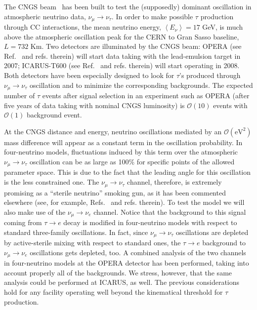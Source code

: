 \documentclass[12pt]{elsart}
\newcommand{\eVq}{\ensuremath{\text{eV}^2}}
\begin{document}
The CNGS beam~\cite{Giacomelli:2007df} has been built to test the
(supposedly) dominant oscillation in atmospheric neutrino data,
$\nu_\mu \to \nu_\tau$.  In order to make possible $\tau$ production
through CC interactions, the mean neutrino energy, $\left< E_\nu
\right> = 17$ GeV, is much above the atmospheric oscillation peak for
the CERN to Gran Sasso baseline, $L = 732$ Km. Two detectors are
illuminated by the CNGS beam: OPERA (see
Ref.~\cite{Acquafredda:2006ki} and refs. therein) will start data
taking with the lead-emulsion target in 2007; ICARUS-T600 (see
Ref.~\cite{Amerio:2004ze} and refs. therein) will start operating in
2008. Both detectors have been especially designed to look for
$\tau$'s produced through $\nu_\mu \to \nu_\tau$ oscillation and to
minimize the corresponding backgrounds. The expected number of $\tau$
events after signal selection in an experiment such as OPERA (after
five years of data taking with nominal CNGS luminosity) is
$\mathcal{O}(10)$ events with $\mathcal{O}(1)$ background event. 

At the CNGS distance and energy, neutrino oscillations mediated by an
$\mathcal{O}(\eVq)$ mass difference will appear as a constant term in
the oscillation probability. In four-neutrino models, fluctuations
induced by this term over the atmospheric $\nu_\mu \to \nu_\tau$
oscillation can be as large as 100\% for specific points of the
allowed parameter space.  This is due to the fact that the leading
angle for this oscillation is the less constrained one. 
%
The $\nu_\mu \to \nu_\tau$ channel, therefore, is extremely promising
as a ``sterile neutrino'' smoking gun, as it has been commented
elsewhere (see, for example, Refs.~\cite{Donini:2001xy, Donini:2001xp}
and refs. therein).  To test the model we will also make use of the
$\nu_\mu \to \nu_e$ channel. Notice that the background to this signal
coming from $\tau \to e$ decay is modified in four-neutrino models
with respect to standard three-family oscillations. In fact, since
$\nu_\mu \to \nu_\tau$ oscillations are depleted by active-sterile
mixing with respect to standard ones, the $\tau \to e$ background to
$\nu_\mu \to \nu_e$ oscillations gets depleted, too. A combined
analysis of the two channels in four-neutrino models at the OPERA
detector has been performed, taking into account properly all of the
backgrounds. We stress, however, that the same analysis could be
performed at ICARUS, as well. The previous considerations hold for any
facility operating well beyond the kinematical threshold for $\tau$
production.
\end{document}
